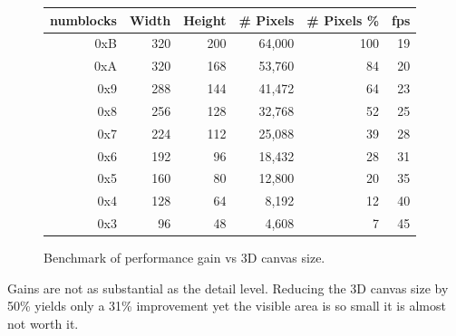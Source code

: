 \begin{figure}[H]
\centering  
\begin{tabularx}{\textwidth}{ R{1}  R{1} R{1} R{1}  R{1.4}  R{0.6} }
  \toprule
  \textbf{numblocks} & \textbf{Width} & \textbf{Height} & \textbf{\# Pixels} & \textbf{\# Pixels \%} & \textbf{fps}\\
  \toprule 

 0xB & 320 & 200 & 64,000 & 100 & 19 \\
 0xA & 320 & 168 & 53,760 &  84 & 20 \\
 0x9 & 288 & 144 & 41,472 &  64 & 23 \\
 0x8 & 256 & 128 & 32,768 &  52 & 25 \\
0x7 & 224 & 112 & 25,088 &  39 & 28 \\
 0x6 & 192 & 96 & 18,432 &  28 & 31  \\
 0x5 & 160 & 80 & 12,800 &  20 & 35  \\
 0x4 & 128 & 64 &  8,192 &  12 & 40  \\
 0x3 &  96 & 48 &  4,608 &   7 & 45  \\
   \toprule
\end{tabularx}
\caption{Benchmark of performance gain vs 3D canvas size.\protect\footnotemark}
\end{figure}

\par
Gains are not as substantial as the detail level. Reducing the 3D canvas size by 50\% yields only a 31\% improvement yet the visible area is so small it is almost not worth it.\\

\par
{
\setlength{\belowcaptionskip}{-10pt}
}


